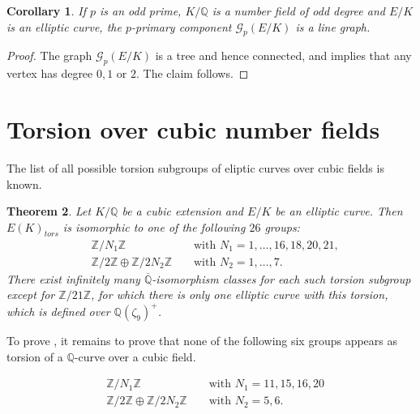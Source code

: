 \documentclass[10pt,leqno]{amsart}
\newcommand{\Z}{\mathbb{Z}}
\newcommand{\Q}{\mathbb{Q}}
\newtheorem{theorem}{Theorem}[]
\newtheorem{corollary}[theorem]{Corollary}
\theoremstyle{definition}
\theoremstyle{remark}
\numberwithin{theorem}{section}
\begin{document}
\begin{corollary}\label{onlylines}
    If $p$ is an odd prime, $K/\Q$ is a number field of odd degree and $E/K$ is an elliptic curve, the $p$-primary component $\mathcal G_p(E/K)$ is a line graph.
\end{corollary}
\begin{proof}
    The graph $\mathcal G_p(E/K)$ is a tree and hence connected, and  implies that any vertex has degree $0,1$ or $2$. The claim follows. 
\end{proof}


\section{Torsion over cubic number fields}\label{cubiccase}

The list of all possible torsion subgroups of eliptic curves over cubic fields is known.

\begin{theorem}\label{cubictorsion}\cite[Theorem A]{cubictorsion}
        Let $K/\Q$ be a cubic extension and $E/K$ be an elliptic curve. Then $E(K)_{tors}$ is isomorphic to one of the following $26$ groups:
        \begin{align*}
            &\Z/N_1\Z && \text{ with } N_1=1,\ldots,16,18,20,21, \\
            &\Z/2\Z\oplus \Z/2N_2\Z && \text{ with } N_2=1,\ldots, 7.
        \end{align*}
        There exist infinitely many $\overline{\Q}$-isomorphism classes for each such torsion subgroup except for $\Z/21\Z$, for which there is only one elliptic curve with this torsion, which is defined over $\Q(\zeta_9)^+$.
\end{theorem}

To prove , it remains to prove that none of the following six groups appears as torsion of a $\Q$-curve over a cubic field.

 \begin{align*}
            &\Z/N_1\Z && \text{ with } N_1=11,15,16,20 \\
            &\Z/2\Z\oplus \Z/2N_2\Z && \text{ with } N_2=5,6.
\end{align*}
\end{document}
